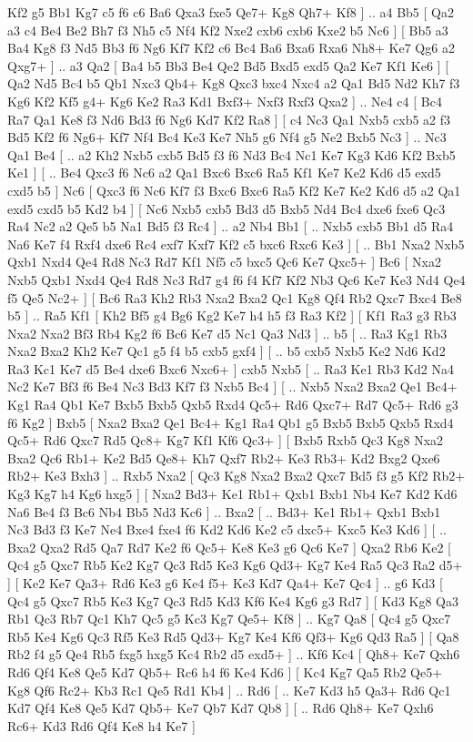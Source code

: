  Kf2 g5  Bb1 Kg7  c5 f6  c6 Ba6  Qxa3 fxe5  Qe7+ Kg8  Qh7+ Kf8   ] .. a4    Bb5 [  Qa2 a3  c4 Be4  Be2 Bh7  f3 Nh5  c5 Nf4  Kf2 Nxe2  cxb6 cxb6  Kxe2 b5  Nc6   ]  [  Bb5 a3  Ba4 Kg8  f3 Nd5  Bb3 f6  Ng6 Kf7  Kf2 c6  Bc4 Ba6  Bxa6 Rxa6  Nh8+ Ke7  Qg6 a2  Qxg7+   ] .. a3    Qa2 [  Ba4 b5  Bb3 Be4  Qe2 Bd5  Bxd5 exd5  Qa2 Ke7  Kf1 Ke6   ]  [  Qa2 Nd5  Bc4 b5  Qb1 Nxc3  Qb4+ Kg8  Qxc3 bxc4  Nxc4 a2  Qa1 Bd5  Nd2 Kh7  f3 Kg6  Kf2 Kf5  g4+ Kg6  Ke2 Ra3  Kd1 Bxf3+  Nxf3 Rxf3  Qxa2   ] .. Ne4    c4 [  Bc4 Ra7  Qa1 Ke8  f3 Nd6  Bd3 f6  Ng6 Kd7  Kf2 Ra8   ]  [  c4 Nc3  Qa1 Nxb5  cxb5 a2  f3 Bd5  Kf2 f6  Ng6+ Kf7  Nf4 Bc4  Ke3 Ke7  Nh5 g6  Nf4 g5  Ne2 Bxb5  Nc3   ] .. Nc3    Qa1   Be4 [ .. a2  Kh2 Nxb5  cxb5 Bd5  f3 f6  Nd3 Bc4  Nc1 Ke7  Kg3 Kd6  Kf2 Bxb5  Ke1   ]  [ .. Be4  Qxc3 f6  Nc6 a2  Qa1 Bxc6  Bxc6 Ra5  Kf1 Ke7  Ke2 Kd6  d5 exd5  cxd5 b5   ]  Nc6 [  Qxc3 f6  Nc6 Kf7  f3 Bxc6  Bxc6 Ra5  Kf2 Ke7  Ke2 Kd6  d5 a2  Qa1 exd5  cxd5 b5  Kd2 b4   ]  [  Nc6 Nxb5  cxb5 Bd3  d5 Bxb5  Nd4 Bc4  dxe6 fxe6  Qc3 Ra4  Nc2 a2  Qe5 b5  Na1 Bd5  f3 Rc4   ] .. a2    Nb4   Bb1 [ .. Nxb5  cxb5 Bb1  d5 Ra4  Na6 Ke7  f4 Rxf4  dxe6 Rc4  exf7 Kxf7  Kf2 c5  bxc6 Rxc6  Ke3   ]  [ .. Bb1  Nxa2 Nxb5  Qxb1 Nxd4  Qe4 Rd8  Nc3 Rd7  Kf1 Nf5  c5 bxc5  Qc6 Ke7  Qxc5+   ]  Bc6 [  Nxa2 Nxb5  Qxb1 Nxd4  Qe4 Rd8  Nc3 Rd7  g4 f6  f4 Kf7  Kf2 Nb3  Qc6 Ke7  Ke3 Nd4  Qe4 f5  Qe5 Nc2+   ]  [  Bc6 Ra3  Kh2 Rb3  Nxa2 Bxa2  Qc1 Kg8  Qf4 Rb2  Qxc7 Bxc4  Be8 b5   ] .. Ra5    Kf1 [  Kh2 Bf5  g4 Bg6  Kg2 Ke7  h4 h5  f3 Ra3  Kf2   ]  [  Kf1 Ra3  g3 Rb3  Nxa2 Nxa2  Bf3 Rb4  Kg2 f6  Bc6 Ke7  d5 Nc1  Qa3 Nd3   ] .. b5 [ .. Ra3  Kg1 Rb3  Nxa2 Bxa2  Kh2 Ke7  Qc1 g5  f4 b5  cxb5 gxf4   ]  [ .. b5  cxb5 Nxb5  Ke2 Nd6  Kd2 Ra3  Kc1 Ke7  d5 Be4  dxe6 Bxc6  Nxc6+   ]  cxb5   Nxb5 [ .. Ra3  Ke1 Rb3  Kd2 Na4  Nc2 Ke7  Bf3 f6  Be4 Nc3  Bd3 Kf7  f3 Nxb5  Bc4   ]  [ .. Nxb5  Nxa2 Bxa2  Qe1 Bc4+  Kg1 Ra4  Qb1 Ke7  Bxb5 Bxb5  Qxb5 Rxd4  Qc5+ Rd6  Qxc7+ Rd7  Qc5+ Rd6  g3 f6  Kg2   ]  Bxb5 [  Nxa2 Bxa2  Qe1 Bc4+  Kg1 Ra4  Qb1 g5  Bxb5 Bxb5  Qxb5 Rxd4  Qc5+ Rd6  Qxc7 Rd5  Qc8+ Kg7  Kf1 Kf6  Qc3+   ]  [  Bxb5 Rxb5  Qc3 Kg8  Nxa2 Bxa2  Qc6 Rb1+  Ke2 Bd5  Qe8+ Kh7  Qxf7 Rb2+  Ke3 Rb3+  Kd2 Bxg2  Qxe6 Rb2+  Ke3 Bxh3   ] .. Rxb5    Nxa2 [  Qc3 Kg8  Nxa2 Bxa2  Qxc7 Bd5  f3 g5  Kf2 Rb2+  Kg3 Kg7  h4 Kg6  hxg5   ]  [  Nxa2 Bd3+  Ke1 Rb1+  Qxb1 Bxb1  Nb4 Ke7  Kd2 Kd6  Na6 Be4  f3 Bc6  Nb4 Bb5  Nd3 Kc6   ] .. Bxa2 [ .. Bd3+  Ke1 Rb1+  Qxb1 Bxb1  Nc3 Bd3  f3 Ke7  Ne4 Bxe4  fxe4 f6  Kd2 Kd6  Ke2 c5  dxc5+ Kxc5  Ke3 Kd6   ]  [ .. Bxa2  Qxa2 Rd5  Qa7 Rd7  Ke2 f6  Qc5+ Ke8  Ke3 g6  Qc6 Ke7   ]  Qxa2   Rb6    Ke2 [  Qc4 g5  Qxc7 Rb5  Ke2 Kg7  Qc3 Rd5  Ke3 Kg6  Qd3+ Kg7  Ke4 Ra5  Qc3 Ra2  d5+   ]  [  Ke2 Ke7  Qa3+ Rd6  Ke3 g6  Ke4 f5+  Ke3 Kd7  Qa4+ Ke7  Qc4   ] .. g6    Kd3 [  Qc4 g5  Qxc7 Rb5  Ke3 Kg7  Qc3 Rd5  Kd3 Kf6  Ke4 Kg6  g3 Rd7   ]  [  Kd3 Kg8  Qa3 Rb1  Qc3 Rb7  Qc1 Kh7  Qc5 g5  Kc3 Kg7  Qe5+ Kf8   ] .. Kg7    Qa8 [  Qc4 g5  Qxc7 Rb5  Ke4 Kg6  Qc3 Rf5  Ke3 Rd5  Qd3+ Kg7  Ke4 Kf6  Qf3+ Kg6  Qd3 Ra5   ]  [  Qa8 Rb2  f4 g5  Qe4 Rb5  fxg5 hxg5  Kc4 Rb2  d5 exd5+   ] .. Kf6    Kc4 [  Qh8+ Ke7  Qxh6 Rd6  Qf4 Ke8  Qe5 Kd7  Qb5+ Rc6  h4 f6  Ke4 Kd6   ]  [  Kc4 Kg7  Qa5 Rb2  Qe5+ Kg8  Qf6 Rc2+  Kb3 Rc1  Qe5 Rd1  Kb4   ] .. Rd6 [ .. Ke7  Kd3 h5  Qa3+ Rd6  Qc1 Kd7  Qf4 Ke8  Qe5 Kd7  Qb5+ Ke7  Qb7 Kd7  Qb8   ]  [ .. Rd6  Qh8+ Ke7  Qxh6 Rc6+  Kd3 Rd6  Qf4 Ke8  h4 Ke7   ] 